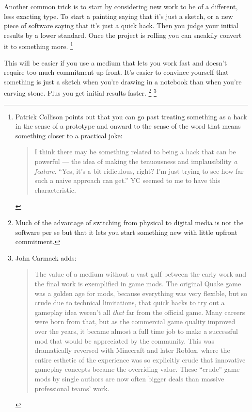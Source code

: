 \documentclass[12pt]{book}
\begin{document}
Another common trick is to start by considering new work to be of a
different, less exacting type. To start a painting saying that it's just
a sketch, or a new piece of software saying that it's just a quick hack.
Then you judge your initial results by a lower standard. Once the
project is rolling you can sneakily convert it to something more.
\footnote{Patrick Collison points out that you can go past treating
something as a hack in the sense of a prototype and onward to the sense
of the word that means something closer to a practical joke:

\begin{quote}
I think there may be something related to being a hack that can be
powerful --- the idea of making the tenuousness and implausibility
\emph{a feature}. ``Yes, it's a bit ridiculous, right? I'm just trying
to see how far such a naive approach can get.'' YC seemed to me to have
this characteristic.
\end{quote}}

This will be easier if you use a medium that lets you work fast and
doesn't require too much commitment up front. It's easier to convince
yourself that something is just a sketch when you're drawing in a
notebook than when you're carving stone. Plus you get initial results
faster. \footnote{Much of the advantage of switching from physical to digital
media is not the software per se but that it lets you start something
new with little upfront commitment.} \footnote{John Carmack adds:

\begin{quote}
The value of a medium without a vast gulf between the early work and the
final work is exemplified in game mods. The original Quake game was a
golden age for mods, because everything was very flexible, but so crude
due to technical limitations, that quick hacks to try out a gameplay
idea weren't all \emph{that} far from the official game. Many careers
were born from that, but as the commercial game quality improved over
the years, it became almost a full time job to make a successful mod
that would be appreciated by the community. This was dramatically
reversed with Minecraft and later Roblox, where the entire esthetic of
the experience was so explicitly crude that innovative gameplay concepts
became the overriding value. These ``crude'' game mods by single authors
are now often bigger deals than massive professional teams' work.
\end{quote}}
\end{document}
